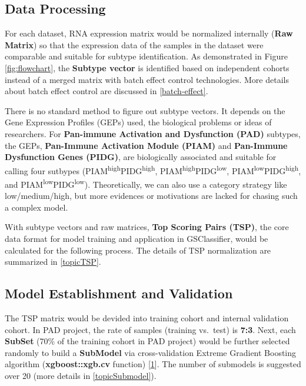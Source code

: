 \documentclass[
  12pt,
]{book}
\begin{document}
\hypertarget{data-processing}{%
\subsection{Data Processing}\label{data-processing}}

For each dataset, RNA expression matrix would be normalized internally (\textbf{Raw Matrix}) so that the expression data of the samples in the dataset were comparable and suitable for subtype identification. As demonstrated in Figure \ref{fig:flowchart}, the \textbf{Subtype vector} is identified based on independent cohorts instead of a merged matrix with batch effect control technologies. More details about batch effect control are discussed in \ref{batch-effect}.

There is no standard method to figure out subtype vectors. It depends on the Gene Expression Profiles (GEPs) used, the biological problems or ideas of researchers. For \textbf{Pan-immune Activation and Dysfunction (PAD)} subtypes, the GEPs, \textbf{Pan-Immune Activation Module (PIAM)} and \textbf{Pan-Immune Dysfunction Genes (PIDG)}, are biologically associated and suitable for calling four sutbypes (PIAM\textsuperscript{high}PIDG\textsuperscript{high}, PIAM\textsuperscript{high}PIDG\textsuperscript{low}, PIAM\textsuperscript{low}PIDG\textsuperscript{high}, and PIAM\textsuperscript{low}PIDG\textsuperscript{low}). Theoretically, we can also use a category strategy like low/medium/high, but more evidences or motivations are lacked for chasing such a complex model.

With subtype vectors and raw matrices, \textbf{Top Scoring Pairs (TSP)}, the core data format for model training and application in GSClassifier, would be calculated for the following process. The details of TSP normalization are summarized in \ref{topicTSP}.

\hypertarget{model-establishment-and-validation}{%
\subsection{Model Establishment and Validation}\label{model-establishment-and-validation}}

The TSP matrix would be devided into training cohort and internal validation cohort. In PAD project, the rate of samples (training vs.~test) is \textbf{7:3}. Next, each \textbf{SubSet} (70\% of the training cohort in PAD project) would be further selected randomly to build a \textbf{SubModel} via cross-validation Extreme Gradient Boosting algorithm (\textbf{xgboost::xgb.cv} function) {[}\protect\hyperlink{ref-RN345}{1}{]}. The number of submodels is suggested over 20 (more details in \ref{topicSubmodel}).
\end{document}
